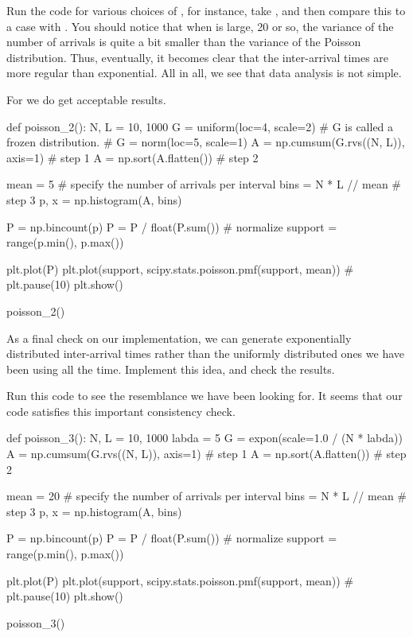 \begin{exercise}
  Run the code for various choices of , for instance, take , and then compare this to a case with .
  You should notice that when  is large, 20 or so, the variance of the number of arrivals is quite a bit smaller than the variance of the Poisson distribution.
  Thus, eventually, it becomes clear that the inter-arrival times are more regular than exponential.
  All in all, we see that data analysis is not simple.
  \begin{solution}
For  we do get acceptable results.

\begin{pyverbatim}
def poisson_2():
    N, L = 10, 1000
    G = uniform(loc=4, scale=2)  # G is called a frozen distribution.
    # G = norm(loc=5, scale=1)
    A = np.cumsum(G.rvs((N, L)), axis=1)  # step 1
    A = np.sort(A.flatten())  # step 2

    mean = 5  # specify the number of arrivals per interval
    bins = N * L // mean  # step 3
    p, x = np.histogram(A, bins)

    P = np.bincount(p)
    P = P / float(P.sum())  # normalize
    support = range(p.min(), p.max())

    plt.plot(P)
    plt.plot(support, scipy.stats.poisson.pmf(support, mean))
    # plt.pause(10)
    plt.show()


poisson_2()
\end{pyverbatim}

\end{solution}
\end{exercise}

\begin{exercise}
  As a final check on our implementation, we can generate exponentially distributed inter-arrival times rather than the uniformly distributed ones we have been using all the time. Implement this idea, and check the results.
  \begin{solution}
    Run this code to see the resemblance we have been looking for.
    It seems that our code satisfies this important consistency check.

\begin{pyverbatim}
def poisson_3():
    N, L = 10, 1000
    labda = 5
    G = expon(scale=1.0 / (N * labda))
    A = np.cumsum(G.rvs((N, L)), axis=1)  # step 1
    A = np.sort(A.flatten())  # step 2

    mean = 20  # specify the number of arrivals per interval
    bins = N * L // mean  # step 3
    p, x = np.histogram(A, bins)

    P = np.bincount(p)
    P = P / float(P.sum())  # normalize
    support = range(p.min(), p.max())

    plt.plot(P)
    plt.plot(support, scipy.stats.poisson.pmf(support, mean))
    # plt.pause(10)
    plt.show()


poisson_3()
\end{pyverbatim}
  \end{solution}

\end{exercise}


